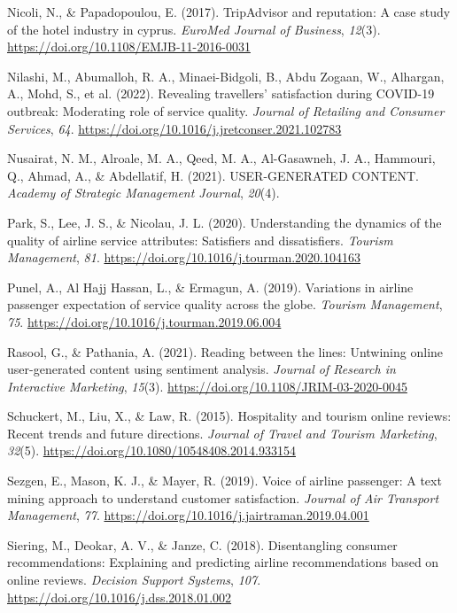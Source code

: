 \documentclass[
]{agujournal2019}
\newlength{\cslhangindent}
\newenvironment{CSLReferences}[2] %
 {\begin{list}{}{%
  \setlength{\itemindent}{0pt}
  \setlength{\leftmargin}{0pt}
  \setlength{\parsep}{0pt}
  \ifodd #1
   \setlength{\leftmargin}{\cslhangindent}
   \setlength{\itemindent}{-1\cslhangindent}
  \fi
  \setlength{\itemsep}{#2\baselineskip}}}
 {\end{list}}
\begin{document}
\begin{CSLReferences}{1}{0}
Nicoli, N., \& Papadopoulou, E. (2017). TripAdvisor and reputation: A
case study of the hotel industry in cyprus. \emph{EuroMed Journal of
Business}, \emph{12}(3). \url{https://doi.org/10.1108/EMJB-11-2016-0031}

Nilashi, M., Abumalloh, R. A., Minaei-Bidgoli, B., Abdu Zogaan, W.,
Alhargan, A., Mohd, S., et al. (2022). Revealing travellers'
satisfaction during COVID-19 outbreak: Moderating role of service
quality. \emph{Journal of Retailing and Consumer Services}, \emph{64}.
\url{https://doi.org/10.1016/j.jretconser.2021.102783}

Nusairat, N. M., Alroale, M. A., Qeed, M. A., Al-Gasawneh, J. A.,
Hammouri, Q., Ahmad, A., \& Abdellatif, H. (2021). USER-GENERATED
CONTENT. \emph{Academy of Strategic Management Journal}, \emph{20}(4).

Park, S., Lee, J. S., \& Nicolau, J. L. (2020). Understanding the
dynamics of the quality of airline service attributes: Satisfiers and
dissatisfiers. \emph{Tourism Management}, \emph{81}.
\url{https://doi.org/10.1016/j.tourman.2020.104163}

Punel, A., Al Hajj Hassan, L., \& Ermagun, A. (2019). Variations in
airline passenger expectation of service quality across the globe.
\emph{Tourism Management}, \emph{75}.
\url{https://doi.org/10.1016/j.tourman.2019.06.004}

Rasool, G., \& Pathania, A. (2021). Reading between the lines: Untwining
online user-generated content using sentiment analysis. \emph{Journal of
Research in Interactive Marketing}, \emph{15}(3).
\url{https://doi.org/10.1108/JRIM-03-2020-0045}

Schuckert, M., Liu, X., \& Law, R. (2015). Hospitality and tourism
online reviews: Recent trends and future directions. \emph{Journal of
Travel and Tourism Marketing}, \emph{32}(5).
\url{https://doi.org/10.1080/10548408.2014.933154}

Sezgen, E., Mason, K. J., \& Mayer, R. (2019). Voice of airline
passenger: A text mining approach to understand customer satisfaction.
\emph{Journal of Air Transport Management}, \emph{77}.
\url{https://doi.org/10.1016/j.jairtraman.2019.04.001}

Siering, M., Deokar, A. V., \& Janze, C. (2018). Disentangling consumer
recommendations: Explaining and predicting airline recommendations based
on online reviews. \emph{Decision Support Systems}, \emph{107}.
\url{https://doi.org/10.1016/j.dss.2018.01.002}


\end{CSLReferences}
\end{document}
